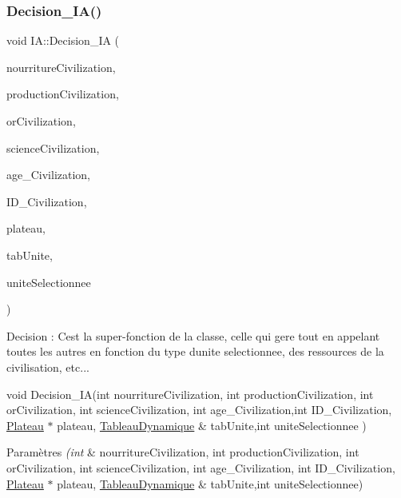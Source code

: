 \subsubsection{\texorpdfstring{Decision\+\_\+\+I\+A()}{Decision\_IA()}}
{\footnotesize\ttfamily void I\+A\+::\+Decision\+\_\+\+IA (\begin{DoxyParamCaption}\item[{int}]{nourriture\+Civilization,  }\item[{int}]{production\+Civilization,  }\item[{int}]{or\+Civilization,  }\item[{int}]{science\+Civilization,  }\item[{int}]{age\+\_\+\+Civilization,  }\item[{int}]{I\+D\+\_\+\+Civilization,  }\item[{\hyperlink{classPlateau}{Plateau} $\ast$}]{plateau,  }\item[{\hyperlink{classTableauDynamique}{Tableau\+Dynamique} \&}]{tab\+Unite,  }\item[{int}]{unite\+Selectionnee }\end{DoxyParamCaption})}



Decision \+: C\textquotesingle{}est la super-\/fonction de la classe, celle qui gere tout en appelant toutes les autres en fonction du type d\textquotesingle{}unite selectionnee, des ressources de la civilisation, etc... 

void Decision\+\_\+\+IA(int nourriture\+Civilization, int production\+Civilization, int or\+Civilization, int science\+Civilization, int age\+\_\+\+Civilization,int I\+D\+\_\+\+Civilization, \hyperlink{classPlateau}{Plateau} $\ast$ plateau, \hyperlink{classTableauDynamique}{Tableau\+Dynamique} \& tab\+Unite,int unite\+Selectionnee ) 
\begin{DoxyParams}{Paramètres}
{\em (int} & nourriture\+Civilization, int production\+Civilization, int or\+Civilization, int science\+Civilization, int age\+\_\+\+Civilization, int I\+D\+\_\+\+Civilization, \hyperlink{classPlateau}{Plateau} $\ast$ plateau, \hyperlink{classTableauDynamique}{Tableau\+Dynamique} \& tab\+Unite,int unite\+Selectionnee) \\
\hline
\end{DoxyParams}
\mbox{\label{classIA_ae12dec33731a54b1f48ad39413e23524}} 
